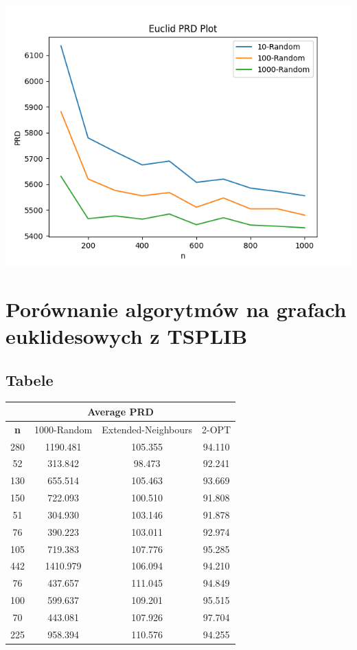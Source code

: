 \documentclass{article}
\begin{document}
\begin{center}
\includegraphics[width=\textwidth, 
                   height = 0.4\textheight, 
                   keepaspectratio]
                  {euc_k_random} 
\end{center}
\newpage
\section{Porównanie algorytmów na grafach euklidesowych z TSPLIB}
\subsection{Tabele}
\begin{center}
\begin{tabular}{|c|c|c|c|}
\hline
\multicolumn{4}{|c|}{\textbf{Average PRD}}\\
\hline
\textbf{n} & 1000-Random & Extended-Neighbours & 2-OPT\\
\hline
280 & 1190.481 & 105.355 & 94.110\\
\hline
52 & 313.842 & 98.473 & 92.241\\
\hline
130 & 655.514 & 105.463 & 93.669\\
\hline
150 & 722.093 & 100.510 & 91.808\\
\hline
51 & 304.930 & 103.146 & 91.878\\
\hline
76 & 390.223 & 103.011 & 92.974\\
\hline
105 & 719.383 & 107.776 & 95.285\\
\hline
442 & 1410.979 & 106.094 & 94.210\\
\hline
76 & 437.657 & 111.045 & 94.849\\
\hline
100 & 599.637 & 109.201 & 95.515\\
\hline
70 & 443.081 & 107.926 & 97.704\\
\hline
225 & 958.394 & 110.576 & 94.255\\
\hline
\end{tabular}
\end{center}
\end{document}
